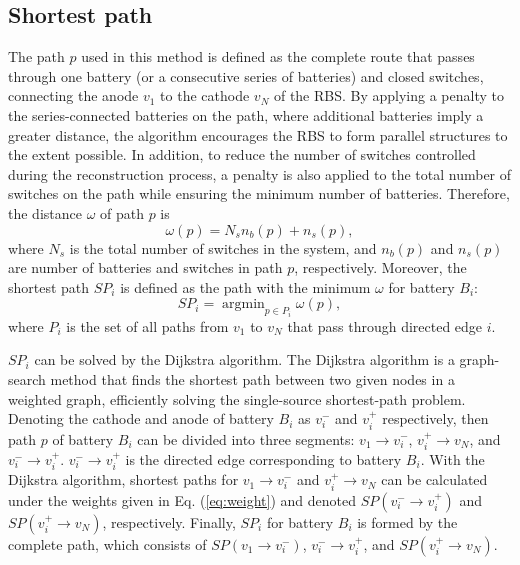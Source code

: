 \documentclass{article}
\begin{document}
\subsection{Shortest path}

The path $p$ used in this method is defined as the complete route that passes through one battery (or a consecutive series of batteries) and closed switches, connecting the anode $v_1$ to the cathode $v_N$ of the RBS.
By applying a penalty to the series-connected batteries on the path, where additional batteries imply a greater distance, the algorithm encourages the RBS to form parallel structures to the extent possible.
In addition, to reduce the number of switches controlled during the reconstruction process, a penalty is also applied to the total number of switches on the path while ensuring the minimum number of batteries.
Therefore, the distance $\omega$ of path $p$ is  
\begin{equation}\label{eq:weight}
    \omega(p) = N_s  n_b (p) + n_s (p),
\end{equation}
where $N_s$ is the total number of switches in the system, 
and $n_b(p)$ and $n_s(p)$ are number of batteries and switches in path $p$, respectively. 
Moreover, the shortest path $SP_i$ is defined as the path with the minimum $\omega$ for battery $B_i$:
\begin{equation}\label{eq:def_sp}
    SP_i = \mathop{\arg\min}_{p \in P_i} \omega(p),
\end{equation}
where $P_i$ is the set of all paths from $v_1$ to $v_N$ that pass through directed edge $i$.


$SP_i$ can be solved by the Dijkstra algorithm.
The Dijkstra algorithm is a graph-search method that finds the shortest path between two given nodes in a weighted graph, efficiently solving the single-source shortest-path problem.
Denoting the cathode and anode of battery $B_i$ as $v_i^-$ and $v_i^+$ respectively, then path $p$ of battery $B_i$  can be divided into three segments: $v_1 \rightarrow v_i^-$, $v_i^+ \rightarrow v_N$, and $v_i^- \rightarrow v_i^+$. $v_i^- \rightarrow v_i^+$ is the directed edge corresponding to battery $B_i$. 
With the Dijkstra algorithm, shortest paths for $v_1 \rightarrow v_i^-$ and $v_i^+ \rightarrow v_N$ can be calculated under the weights given in Eq. (\ref{eq:weight}) and denoted $SP(v_i^- \rightarrow v_i^+)$ and $SP(v_i^+ \rightarrow v_N)$, respectively.
Finally, $SP_i$ for battery $B_i$ is formed by the complete path, which consists of $SP(v_1 \rightarrow v_i^-)$, $v_i^- \rightarrow v_i^+$, and $SP(v_i^+ \rightarrow v_N)$.
\end{document}
